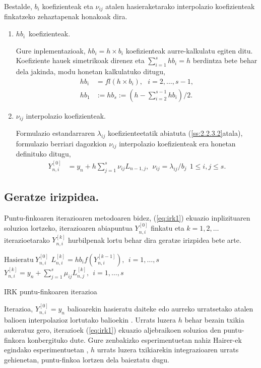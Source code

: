 Bestalde, $b_i$ koefizienteak eta $\nu_{ij}$ atalen hasieraketarako interpolazio koefizienteak finkatzeko zehaztapenak honakoak dira.
\begin{enumerate}
\item $hb_{i}$~koefizienteak.

Gure inplementazioak, $hb_i=h \times b_i$ koefizienteak aurre-kalkulatu egiten ditu. Koefiziente hauek simetrikoak direnez eta  $\sum\limits_{i=1}^{s} hb_i=h$ berdintza bete behar dela jakinda, modu honetan kalkulatuko ditugu,
\begin{align*}
hb_i & = fl(h \times b_i), \ \ \ i=2,\dots,s-1, \\
hb_1 & :=hb_s:= \left(h - \sum\limits_{i=2}^{s-1} hb_i \right)/2.
\end{align*}

\item $\nu_{ij}$ interpolazio koefizienteak.

Formulazio estandarraren $\lambda_{ij}$ koefizienteetatik abiatuta (\ref{ss:2.2.3.2}atala), formulazio berriari dagozkion $\nu_{ij}$ interpolazio  koefizienteak era honetan definituko ditugu,
\begin{align}
\label{eq: interpLi}
Y_{n,i}^{[0]} &= y_n+ h \sum\limits_{j=1}^{s} \nu_{ij} L_{n-1,j}, \ \ \nu_{ij}=\lambda_{ij}/b_j \ \ 1\leqslant i,j \leqslant s.
\end{align} 

\end{enumerate}

\subsection{Geratze irizpidea.}


Puntu-finkoaren iterazioaren metodoaren bidez, (\ref{eq:irk1}) ekuazio inplizituaren soluzioa lortzeko, iterazioaren abiapuntua $Y_{n,i}^{[0]}$  finkatu  eta $k=1,2,\dots$ iterazioetarako $Y_{n,i}^{[k]}$ hurbilpenak lortu behar dira geratze irizpidea bete arte.


\begin{algorithm}[H]
  $\text{Hasieratu} \ Y_{n,i}^{[0]}$\;
  {
  \BlankLine
   $L_{n,i}^{[k]}=hb_if(Y_{n,i}^{[k-1]}), \ \  i=1,\dots,s $\;
   $Y_{n,i}^{[k]}=y_n+\sum\limits_{j=1}^{s} \mu_{ij} L_{n,j}^{[k]} , \ \  i=1,\dots,s $\; 
   }
 \caption{IRK puntu-finkoaren iterazioa}
 \label{alg:pf}
\end{algorithm}
 
Iterazioa,  $Y_{n,i}^{[0]}=y_n$ balioarekin hasieratu daiteke edo aurreko urratsetako atalen balioen interpolazioz lortutako balioekin \cite{Hairer2006}.  Urrats luzera $h$ behar bezain txikia aukeratuz gero, iterazioek (\ref{eq:irk1}) ekuazio aljebraikoen  soluzioa den puntu-finkora konbergituko dute. Gure zenbakizko esperimentuetan nahiz Hairer-ek egindako esperimentuetan \cite{Hairer2008}, $h$ urrats luzera txikiarekin integrazioaren urrats gehienetan, puntu-finkoa lortzen dela baieztatu dugu.    
 
